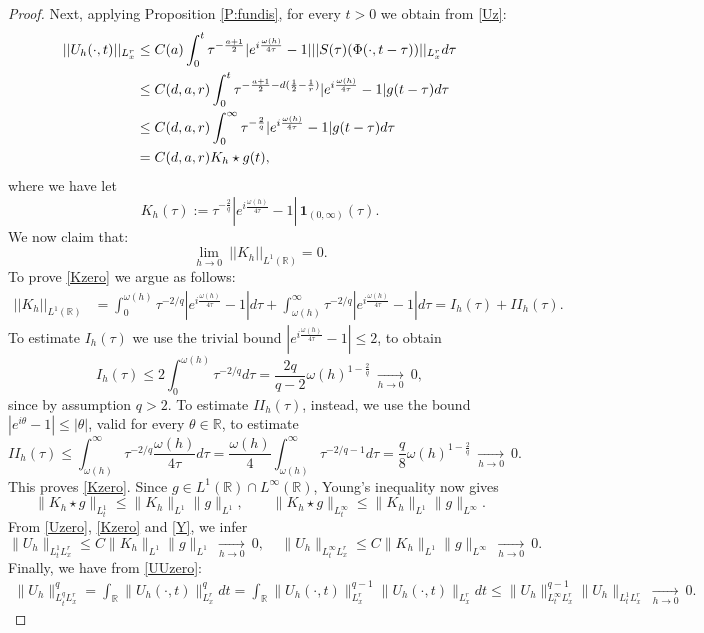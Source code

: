 \documentclass[11pt,letter]{amsart}
\def \R {\mathbb{R}}
\numberwithin{equation}{section}
\numberwithin{equation}{section}
\begin{document}
\begin{proof}
Next, applying Proposition \ref{P:fundis}, for every $t>0$ we obtain from \eqref{Uz}:
\begin{align}\label{Uzero}
||U_h(\cdot,t)||_{L_x^r} & \le C(a)
\int_0^t \tau^{-\frac{a+1}{2}}
|e^{i\frac{\omega(h)}{4\tau}}-1|
||S(\tau)(\Phi(\cdot,t-\tau))||_{L_x^r} d\tau 
\\
& \le C(d,a,r) \int_0^t \tau^{-\frac{a+1}{2} -d(\frac 12 - \frac 1r)}
|e^{i \frac{\omega(h)}{4\tau}}-1| g(t-\tau) d\tau
\notag 
\\
& \le C(d,a,r) \int_0^\infty \tau^{-\frac 2q} |e^{i \frac{\omega(h)}{4\tau}}-1|  g(t-\tau) d\tau
\notag 
\\
&  = C(d,a,r) K_h \star g(t),
\notag
\end{align}
where we have let 
\[
K_h(\tau):= \tau^{-\frac 2q}|e^{i\frac{\omega(h)}{4\tau}}-1|\,\mathbf 1_{(0,\infty)}(\tau).
\]
We now claim that:
\begin{equation}\label{Kzero}
\underset{h\to 0}{\lim}\ ||K_h||_{L^1(\R)} = 0.
\end{equation}
To prove \eqref{Kzero} we argue as follows:
\begin{align*}
||K_h||_{L^1(\R)} & = \int_0^{\omega(h)} \tau^{-2/q}|e^{i\frac{\omega(h)}{4\tau}}-1| d\tau + \int_{\omega(h)}^\infty \tau^{-2/q}|e^{i\frac{\omega(h)}{4\tau}}-1| d\tau = I_h(\tau) + II_h(\tau).
\end{align*}
To estimate $I_h(\tau)$ we use the trivial bound
$|e^{i\frac{\omega(h)}{4\tau}}-1|\le 2$,
to obtain
\[
I_h(\tau) \le 2 \int_0^{\omega(h)} \tau^{-2/q} d\tau = \frac{2q}{q-2} \omega(h)^{1-\frac 2q}\ \underset{h\to 0}{\longrightarrow}\ 0,
\]
since by assumption $q>2$. To estimate $II_h(\tau)$, instead, we use the bound $|e^{i \theta} - 1| \le |\theta|$, valid for every $\theta\in \R$, to estimate
\[
II_h(\tau) \le \int_{\omega(h)}^\infty \tau^{-2/q} \frac{\omega(h)}{4\tau} d\tau = \frac{\omega(h)}4 \int_{\omega(h)}^\infty \tau^{-2/q -1}  d\tau = \frac q8 \omega(h)^{1-\frac 2q}\ \underset{h\to 0}{\longrightarrow}\ 0.
\]
This proves \eqref{Kzero}. 
Since $g\in L^1(\R)\cap L^\infty(\R)$, Young's inequality now gives
\begin{equation}\label{Y}
\|K_h\star g\|_{L_t^1}\le \|K_h\|_{L^1}\|g\|_{L^1},
\qquad
\|K_h\star g\|_{L_t^\infty}\le \|K_h\|_{L^1}\|g\|_{L^\infty}.
\end{equation}
From \eqref{Uzero}, \eqref{Kzero} and \eqref{Y}, we infer
\begin{equation}\label{UUzero}
\|U_h\|_{L_t^1L_x^r}
\le C\|K_h\|_{L^1}\|g\|_{L^1}\
\underset{h\to 0}{\longrightarrow}\ 0,\ \ \ \ \ \|U_h\|_{L_t^\infty L_x^r}
\le C\|K_h\|_{L^1}\|g\|_{L^\infty}\
\underset{h\to 0}{\longrightarrow}\ 0.
\end{equation}
Finally, we have from \eqref{UUzero}:
\begin{align*}
\|U_h\|^q_{L_t^qL_x^r} = \int_\R \|U_h(\cdot,t)\|^q_{L_x^r} dt = \int_\R \|U_h(\cdot,t)\|^{q-1}_{L_x^r} \|U_h(\cdot,t)\|_{L_x^r}dt \le \|U_h\|^{q-1}_{L_t^\infty L_x^r} \|U_h\|_{L_t^1 L_x^r}\
\underset{h\to 0}{\longrightarrow}\ 0.
\end{align*} 


\end{proof}
\end{document}
